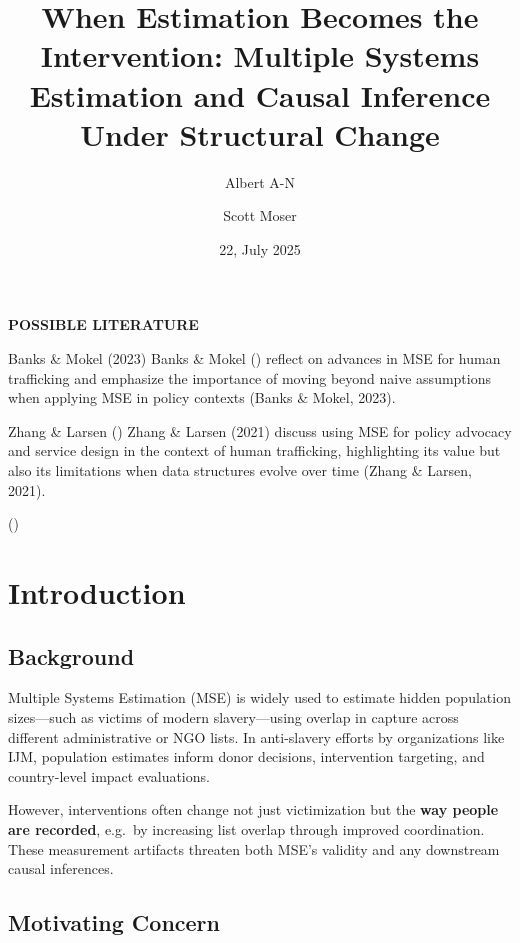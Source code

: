 \documentclass[
  12pt,
]{article}
\title{When Estimation Becomes the Intervention: Multiple Systems
Estimation and Causal Inference Under Structural Change}
\author{Albert A-N \and Scott Moser}
\date{22, July 2025}
\theoremstyle{plain}
\theoremstyle{definition}
\renewcommand*\contentsname{Table of contents}
\newcommand\contentsname{Table of contents}
\begin{document}
\maketitle

\renewcommand*\contentsname{Table of contents}
{
\hypersetup{linkcolor=}
\setcounter{tocdepth}{3}
\tableofcontents
}

\newpage

\textbf{POSSIBLE LITERATURE}

Banks \& Mokel (2023) Banks \& Mokel
() reflect on advances in MSE for
human trafficking and emphasize the importance of moving beyond naive
assumptions when applying MSE in policy contexts (Banks \& Mokel, 2023).

Zhang \& Larsen () Zhang \& Larsen
(2021) discuss using MSE for policy advocacy and service design in the
context of human trafficking, highlighting its value but also its
limitations when data structures evolve over time (Zhang \& Larsen,
2021).

()

\section{Introduction}\label{introduction}

\subsection{Background}\label{background}

Multiple Systems Estimation (MSE) is widely used to estimate hidden
population sizes---such as victims of modern slavery---using overlap in
capture across different administrative or NGO lists. In anti-slavery
efforts by organizations like IJM, population estimates inform donor
decisions, intervention targeting, and country-level impact evaluations.

However, interventions often change not just victimization but the
\textbf{way people are recorded}, e.g.~by increasing list overlap
through improved coordination. These measurement artifacts threaten both
MSE's validity and any downstream causal inferences.

\subsection{Motivating Concern}\label{motivating-concern}
\end{document}
